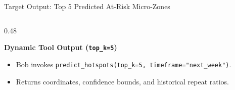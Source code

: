 \documentclass[aspectratio=169,10pt]{beamer}
\begin{document}
\begin{frame}{Target Output: Top 5 Predicted At-Risk Micro-Zones}
\begin{columns}[T]
    \begin{column}{0.48\textwidth}
      \begin{block}{\textbf{Dynamic Tool Output (\texttt{top\_k=5})}}
        \footnotesize
        \begin{itemize}\itemsep=0.2em
          \item Bob invokes \texttt{predict\_hotspots(top\_k=5, timeframe="next\_week")}.
          \item Returns coordinates, confidence bounds, and historical repeat ratios.
        \end{itemize}
      \end{block}
    \end{column}
  \end{columns}
\end{frame}
\end{document}
